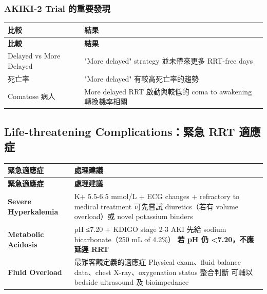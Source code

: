 \documentclass[12pt,a4paper]{article}
\begin{document}
\subsubsection{AKIKI-2 Trial 的重要發現}

\begin{longtable}{p{4cm}p{10cm}}
\toprule
\textbf{比較} & \textbf{結果} \\
\midrule
\endfirsthead

\toprule
\textbf{比較} & \textbf{結果} \\
\midrule
\endhead

\bottomrule
\endfoot

Delayed vs More Delayed & "More delayed" strategy 並未帶來更多 RRT-free days \\
\midrule
死亡率 & "More delayed" 有較高死亡率的趨勢 \\
\midrule
Comatose 病人 & More delayed RRT 啟動與較低的 coma to awakening 轉換機率相關 \\
\bottomrule
\end{longtable}

\subsection{Life-threatening Complications：緊急 RRT 適應症}

\begin{longtable}{p{5cm}p{9cm}}
\toprule
\textbf{緊急適應症} & \textbf{處理建議} \\
\midrule
\endfirsthead

\toprule
\textbf{緊急適應症} & \textbf{處理建議} \\
\midrule
\endhead

\bottomrule
\endfoot

\textbf{Severe Hyperkalemia} &
K+ 5.5-6.5 mmol/L + ECG changes + refractory to medical treatment\newline
可先嘗試 diuretics（若有 volume overload）或 novel potassium binders \\
\midrule

\textbf{Metabolic Acidosis} &
pH ≤7.20 + KDIGO stage 2-3 AKI\newline
先給 sodium bicarbonate（250 mL of 4.2\%）\newline
\textbf{若 pH 仍 <7.20，不應延遲 RRT} \\
\midrule

\textbf{Fluid Overload} &
最難客觀定義的適應症\newline
Physical exam、fluid balance data、chest X-ray、oxygenation status 整合判斷\newline
可輔以 bedside ultrasound 及 bioimpedance \\
\bottomrule
\end{longtable}
\end{document}
